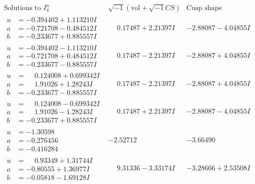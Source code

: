 \documentclass[1p]{elsarticle_modified}
\theoremstyle{definition}
\newcommand{\I}{\sqrt{-1}}
\begin{document}
$$\begin{array}{c|c|c}  
\text{Solutions to }I^u_{4}& \I (\text{vol} + \sqrt{-1}CS) & \text{Cusp shape}\\
 \hline 
\begin{aligned}
u &= -0.394402 + 1.113210 I \\
a &= -0.721708 - 0.484512 I \\
b &= -0.233677 + 0.885557 I\end{aligned}
 & \phantom{-}0.17487 + 2.21397 I & -2.88087 - 4.04855 I \\ \hline\begin{aligned}
u &= -0.394402 - 1.113210 I \\
a &= -0.721708 + 0.484512 I \\
b &= -0.233677 - 0.885557 I\end{aligned}
 & \phantom{-}0.17487 - 2.21397 I & -2.88087 + 4.04855 I \\ \hline\begin{aligned}
u &= \phantom{-}0.124008 + 0.699342 I \\
a &= \phantom{-}1.91026 + 1.28243 I \\
b &= -0.233677 - 0.885557 I\end{aligned}
 & \phantom{-}0.17487 - 2.21397 I & -2.88087 + 4.04855 I \\ \hline\begin{aligned}
u &= \phantom{-}0.124008 - 0.699342 I \\
a &= \phantom{-}1.91026 - 1.28243 I \\
b &= -0.233677 + 0.885557 I\end{aligned}
 & \phantom{-}0.17487 + 2.21397 I & -2.88087 - 4.04855 I \\ \hline\begin{aligned}
u &= -1.30598\phantom{ +0.000000I} \\
a &= -0.276456\phantom{ +0.000000I} \\
b &= -0.416284\phantom{ +0.000000I}\end{aligned}
 & -2.52712\phantom{ +0.000000I} & -3.66490\phantom{ +0.000000I} \\ \hline\begin{aligned}
u &= \phantom{-}0.93349 + 1.31744 I \\
a &= -0.80555 + 1.36977 I \\
b &= -0.05818 - 1.69128 I\end{aligned}
 & \phantom{-}9.31336 - 3.33174 I & -3.28666 + 2.53508 I \\ \hline\begin{aligned}

\end{aligned}
\end{array}$$
\end{document}
